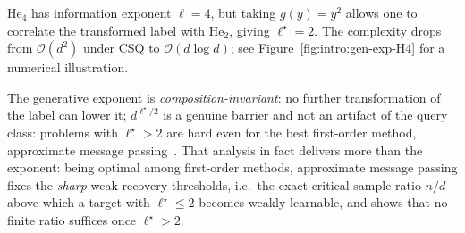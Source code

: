 \begin{example}[\(\mathrm{He}_4\)]
 \(\mathrm{He}_4\) has information exponent \(\ell = 4\), but taking \(g(y) = y^2\) allows one to correlate the transformed label with \(\mathrm{He}_2\), giving \(\ell^\star = 2\). The complexity drops from \(\mathcal{O}(d^2)\) under CSQ to \(\mathcal{O}(d\log d)\); see Figure~\ref{fig:intro:gen-exp-H4} for a numerical illustration.
\end{example}
The generative exponent is \emph{composition-invariant}: no further transformation of the label can lower it; \(d^{\ell^\star/2}\) is a genuine barrier and not an artifact of the query class: problems with \(\ell^\star > 2\) are hard even for the best first-order method, approximate message passing~\citep{troiani2024fundamental}. That analysis in fact delivers more than the exponent: being optimal among first-order methods, approximate message passing fixes the \emph{sharp} weak-recovery thresholds, i.e.\ the exact critical sample ratio \(n/d\) above which a target with \(\ell^\star \leq 2\) becomes weakly learnable, and shows that no finite ratio suffices once \(\ell^\star > 2\).

